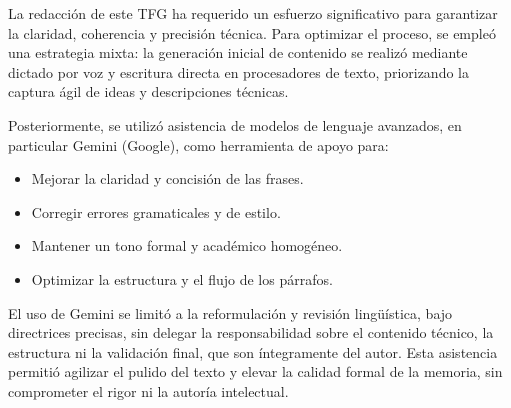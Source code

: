 La redacción de este TFG ha requerido un esfuerzo significativo para garantizar la claridad, coherencia y precisión técnica. Para optimizar el proceso, se empleó una estrategia mixta: la generación inicial de contenido se realizó mediante dictado por voz y escritura directa en procesadores de texto, priorizando la captura ágil de ideas y descripciones técnicas.

Posteriormente, se utilizó asistencia de modelos de lenguaje avanzados, en particular Gemini (Google), como herramienta de apoyo para:
\begin{itemize}
    \item Mejorar la claridad y concisión de las frases.
    \item Corregir errores gramaticales y de estilo.
    \item Mantener un tono formal y académico homogéneo.
    \item Optimizar la estructura y el flujo de los párrafos.
\end{itemize}
El uso de Gemini se limitó a la reformulación y revisión lingüística, bajo directrices precisas, sin delegar la responsabilidad sobre el contenido técnico, la estructura ni la validación final, que son íntegramente del autor. Esta asistencia permitió agilizar el pulido del texto y elevar la calidad formal de la memoria, sin comprometer el rigor ni la autoría intelectual.
